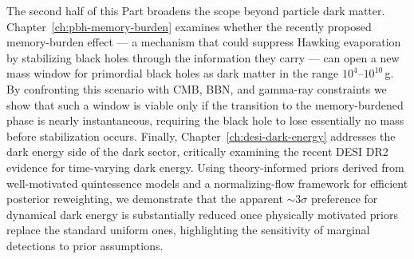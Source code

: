The second half of this Part broadens the scope beyond particle dark matter. Chapter~\ref{ch:pbh-memory-burden} examines whether the recently proposed memory-burden effect --- a mechanism that could suppress Hawking evaporation by stabilizing black holes through the information they carry --- can open a new mass window for primordial black holes as dark matter in the range $10^4$--$10^{10}\,$g. By confronting this scenario with CMB, BBN, and gamma-ray constraints we show that such a window is viable only if the transition to the memory-burdened phase is nearly instantaneous, requiring the black hole to lose essentially no mass before stabilization occurs. Finally, Chapter~\ref{ch:desi-dark-energy} addresses the dark energy side of the dark sector, critically examining the recent DESI DR2 evidence for time-varying dark energy. Using theory-informed priors derived from well-motivated quintessence models and a normalizing-flow framework for efficient posterior reweighting, we demonstrate that the apparent ${\sim}3\sigma$ preference for dynamical dark energy is substantially reduced once physically motivated priors replace the standard uniform ones, highlighting the sensitivity of marginal detections to prior assumptions.
